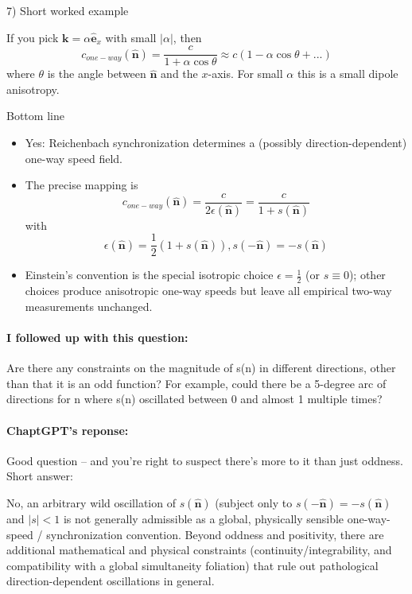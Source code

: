 \documentclass[a4paper]{article}
\theoremstyle{plain}
\theoremstyle{definition}
\newcommand{\vect}[1]{\mathbf{#1}}
\newcommand{\hatvec}[1]{\hat{\mathbf{#1}}}
\begin{document}
7) Short worked example

If you pick $\vect{k} = \alpha \hatvec{e}_x$ with small $|\alpha|$, then
\begin{equation}
c_{one-way}(\hatvec{n}) = \frac{c}{1 + \alpha \cos \theta} \approx c(1 - \alpha \cos \theta + ...)
\end{equation}
where $\theta$ is the angle between $\hatvec{n}$ and the $x$-axis.
For small $\alpha$ this is a small dipole anisotropy.

Bottom line

\begin{itemize}
\item Yes: Reichenbach synchronization determines a (possibly
  direction-dependent) one-way speed field.
\item The precise mapping is
\begin{equation}
c_{one-way}(\hatvec{n}) = \frac{c}{2\epsilon(\hatvec{n})} = \frac{c}{1+s(\hatvec{n})}
\end{equation}
with
\begin{equation}
\epsilon(\hatvec{n}) = \frac{1}{2}(1+s(\hatvec{n})), s(-\hatvec{n}) = -s(\hatvec{n})
\end{equation}
\item Einstein's convention is the special isotropic choice
  $\epsilon = \frac{1}{2}$ (or $s \equiv 0$); other choices produce
  anisotropic one-way speeds but leave all empirical two-way
  measurements unchanged.
\end{itemize}


\paragraph{I followed up with this question:}

Are there any constraints on the magnitude of s(n) in different
directions, other than that it is an odd function?  For example, could
there be a 5-degree arc of directions for n where s(n) oscillated
between 0 and almost 1 multiple times?


\paragraph{ChaptGPT's reponse:}

Good question -- and you're right to suspect there's more to it than
just oddness.  Short answer:

No, an arbitrary wild oscillation of $s(\hatvec{n})$
(subject only to $s(-\hatvec{n}) = -s(\hatvec{n})$
and $|s| < 1$
is not generally admissible as a global, physically sensible
one-way-speed / synchronization convention.  Beyond oddness and
positivity, there are additional mathematical and physical constraints
(continuity/integrability, and compatibility with a global
simultaneity foliation) that rule out pathological direction-dependent
oscillations in general.
\end{document}
